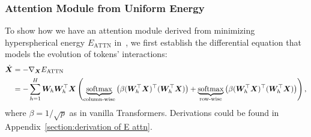 \subsubsection{Attention Module from Uniform Energy}
\label{section:attention}
To show how we have an attention module derived from minimizing hyperspherical energy $E_{\text{ATTN}}$ in~, we first establish the differential equation that models the evolution of tokens' interactions: 
\begin{equation}
\label{eq:6}
\begin{aligned}
\dot{{\bm{X}}} &= -\nabla_{{\bm{X}}} E_{\text{ATTN}}   \\
&=-\sum_{h=1}^H{\bm{W}}_h{\bm{W}}_h^\top{\bm{X}}\left( \underbrace{\operatorname{softmax}}_{\text{column-wise}}\left(\beta ({\bm{W}}_h^\top{\bm{X}})^\top({\bm{W}}_h^\top{\bm{X}})\right)+ \underbrace{\operatorname{softmax}}_{\text{row-wise}}\left(\beta ({\bm{W}}_h^\top{\bm{X}})^\top({\bm{W}}_h^\top{\bm{X}})\right) \right),
\end{aligned}   
\end{equation}
where $\beta=1/\sqrt{p}$ as in vanilla Transformers. Derivations could be found in Appendix~\ref{section:derivation of E attn}. 

